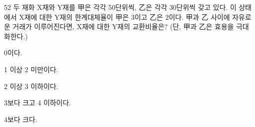 \begin{question}{52}
두 재화 X재와 Y재를 甲은 각각 50단위씩, 乙은 각각 30단위씩 갖고 있다. 이 상태에서 X재에 대한 Y재의 한계대체율이 甲은 3이고 乙은 2이다. 甲과 乙 사이에 자유로운 거래가 이루어진다면, X재에 대한 Y재의 교환비율은? (단, 甲과 乙은 효용을 극대화한다.)
\begin{choices}
  \item 0이다.
  \item 1 이상 2 미만이다.
  \item 2 이상 3 이하이다.
  \item 3보다 크고 4 이하이다.
  \item 4보다 크다.
\end{choices}
\end{question}
